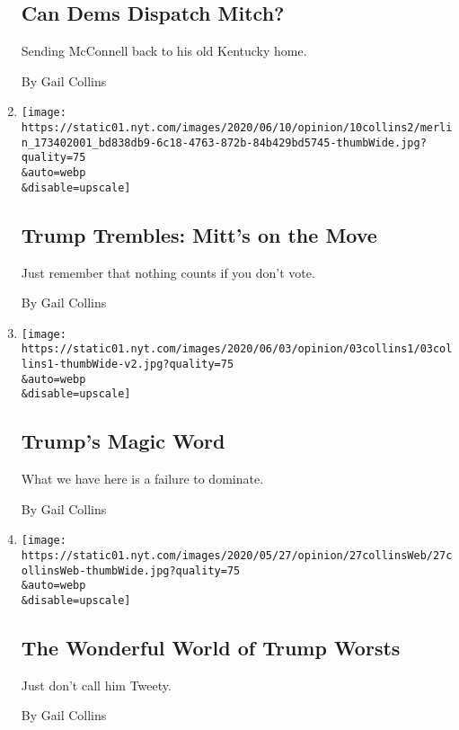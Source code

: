\begin{enumerate}
  \hypertarget{can-dems-dispatch-mitch}{%
  \subsection{Can Dems Dispatch Mitch?}\label{can-dems-dispatch-mitch}}

  Sending McConnell back to his old Kentucky home.

  By Gail Collins
\item
  \href{/2020/06/10/opinion/trump-romney-murkowski.html}{}

  \texttt{[image: https://static01.nyt.com/images/2020/06/10/opinion/10collins2/merlin\_173402001\_bd838db9-6c18-4763-872b-84b429bd5745-thumbWide.jpg?quality=75\\\&auto=webp\\\&disable=upscale]}

  \hypertarget{trump-trembles-mitts-on-the-move}{%
  \subsection{Trump Trembles: Mitt's on the
  Move}\label{trump-trembles-mitts-on-the-move}}

  Just remember that nothing counts if you don't vote.

  By Gail Collins
\item
  \href{/2020/06/03/opinion/trump-dominate.html}{}

  \texttt{[image: https://static01.nyt.com/images/2020/06/03/opinion/03collins1/03collins1-thumbWide-v2.jpg?quality=75\\\&auto=webp\\\&disable=upscale]}

  \hypertarget{trumps-magic-word}{%
  \subsection{Trump's Magic Word}\label{trumps-magic-word}}

  What we have here is a failure to dominate.

  By Gail Collins
\item
  \href{/2020/05/27/opinion/donald-trump.html}{}

  \texttt{[image: https://static01.nyt.com/images/2020/05/27/opinion/27collinsWeb/27collinsWeb-thumbWide.jpg?quality=75\\\&auto=webp\\\&disable=upscale]}

  \hypertarget{the-wonderful-world-of-trump-worsts}{%
  \subsection{The Wonderful World of Trump
  Worsts}\label{the-wonderful-world-of-trump-worsts}}

  Just don't call him Tweety.

  By Gail Collins
\end{enumerate}

